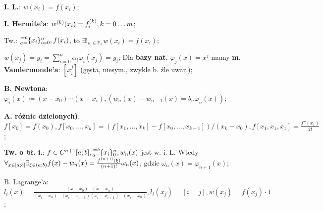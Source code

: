 
\entry
\textbf{I. L.}:
$w(x_i) = f(x_i)$;

\entry
\textbf{I. Hermite'a}:
$w^{(k)}(x_i) = f^{(k)}_i, k = 0 \ldots m$;

\entry
Tw.:
$\ipoints[i=0][n][a=][=b]{x_i}, f(x_i)$,
to
$\exists!_{w \in \mathbb{P}_n} w(x_i)=f(x_i)$;

\entry
$w(x_j) = y_i = \sum_{i=0}^n\alpha_i\varphi_i(x_j) = y_i$;
\entry
Dla \textbf{bazy nat.}
$\varphi_j(x)=x^j$
mamy \textbf{m. Vandermonde'a}:
$[x^j_i]$
(gęsta, niesym., zwykle b. źle uwar.);

\entry
\textbf{B. Newtona}:
$\varphi_i(x) \coloneqq (x-x_0)\cdots(x-x_i),
(w_n(x)-w_{n-1}(x) = b_n\varphi_n(x))$;

\entry
\textbf{A. różnic dzielonych)}:
$
f[x_0] = f(x_0),
f[x_0,\ldots,x_k] = (f[x_1,\ldots,x_k] - f[x_0,\ldots,x_{k-1}])/(x_k - x_0),
f[x_1, x_1, x_1] = \frac{f''(x_1)}{2!}
$;


\textbf{Tw. o bł. i.}:
$f\in C^{n+1}[a;b], \ipoints[0][n][a=][=b]{x_i}, w_n(x)$ jest w. i. L.
Wtedy
$\forall_{x \in [a;b]} \exists_{\xi \in (a;b)} f(x) - w_n(x) = \frac{f^{(n+1)}(\xi)}{(n+1)!}\omega_n(x)$,
gdzie $\omega_n(x)=\varphi_{n+1}(x)$;


\entry
B. Lagrange'a:
$
l_i(x) = \frac{(x-x_0)\cdots(x-x_n)}{(x_i - x_0)\cdots(x_i - x_{i-1})(x_i - x_{i+1}) \cdots (x_i - x_n)},
l_i(x_j) = [i=j],
w(x_j)=f(x_j)\cdot 1
$;

